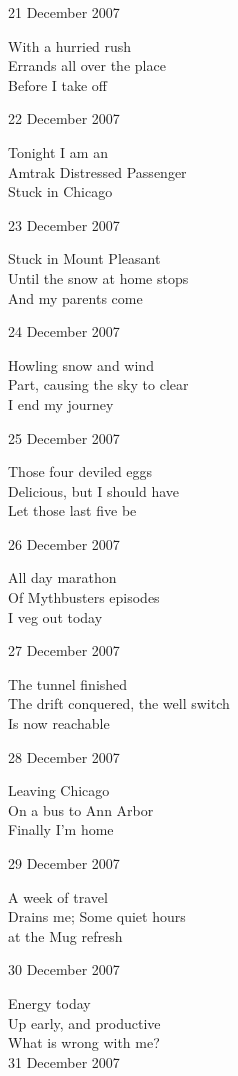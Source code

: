 \documentclass[12pt]{article}
\begin{document}
21 December 2007

With a hurried rush \\
Errands all over the place \\
Before I take off

22 December 2007

Tonight I am an \\
Amtrak Distressed Passenger \\
Stuck in Chicago

23 December 2007

Stuck in Mount Pleasant \\
Until the snow at home stops \\
And my parents come

24 December 2007

Howling snow and wind \\
Part, causing the sky to clear \\
I end my journey

\newpage

25 December 2007

Those four deviled eggs \\
Delicious, but I should have \\
Let those last five be

26 December 2007

All day marathon \\
Of Mythbusters episodes \\
I veg out today

27 December 2007

The tunnel finished \\
The drift conquered, the well switch \\
Is now reachable

28 December 2007

Leaving Chicago \\
On a bus to Ann Arbor \\
Finally I'm home

29 December 2007

A week of travel \\
Drains me; Some quiet hours \\
at the Mug refresh

30 December 2007

Energy today \\
Up early, and productive \\
What is wrong with me? \\

31 December 2007
\end{document}
